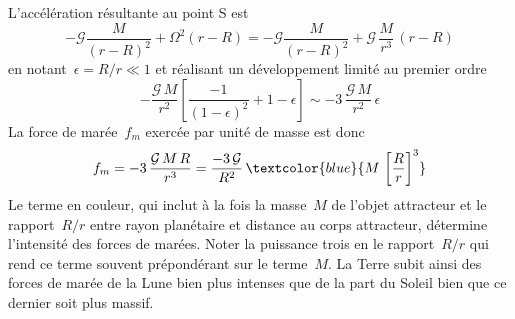 \sk
L'accélération résultante au point S est
\[ -\mathcal{G} \frac{M}{(r-R)^2} + \Omega^2 (r-R) = -\mathcal{G} \frac{M}{(r-R)^2} + \mathcal{G} \, \frac{M}{r^3} \, (r-R) \]
\noindent en notant~$\epsilon = R/r \ll 1$ et réalisant un développement limité au premier ordre
\[ -\frac{\mathcal{G}\,M}{r^2} \left[ \frac{-1}{(1-\epsilon)^2} + 1-\epsilon \right] \sim - 3 \, \frac{\mathcal{G}\,M}{r^2} \,\epsilon \]
La force de marée~$f_m$ exercée par unité de masse est donc
\[ f_m = - 3 \, \frac{\mathcal{G}\,M\,R}{r^3} = \frac{-3\,\mathcal{G}}{R^2} \, \textcolor{blue}{ M \, \left[ \frac{R}{r} \right]^3 } \]
\noindent Le terme en couleur, qui inclut à la fois la masse~$M$ de l'objet attracteur et le rapport~$R/r$ entre rayon planétaire et distance au corps attracteur, détermine l'intensité des forces de marées. Noter la puissance trois en le rapport~$R/r$ qui rend ce terme souvent prépondérant sur le terme~$M$. La Terre subit ainsi des forces de marée de la Lune bien plus intenses que de la part du Soleil bien que ce dernier soit plus massif.











